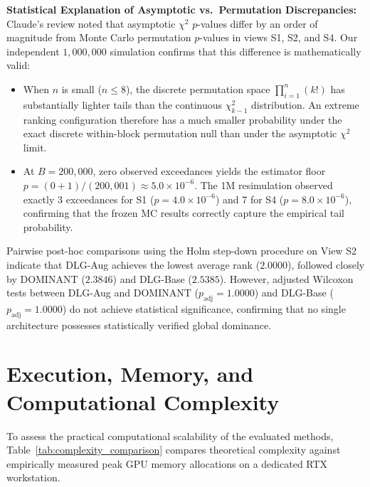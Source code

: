 \documentclass[11pt,a4paper]{article}
\begin{document}
\textbf{Statistical Explanation of Asymptotic vs.\ Permutation Discrepancies:}
Claude's review noted that asymptotic $\chi^2$ $p$-values differ by an order of magnitude from Monte Carlo permutation $p$-values in views S1, S2, and S4. Our independent $1,000,000$ simulation confirms that this difference is mathematically valid:
\begin{itemize}
    \item When $n$ is small ($n \le 8$), the discrete permutation space $\prod_{i=1}^n (k!)$ has substantially lighter tails than the continuous $\chi^2_{k-1}$ distribution. An extreme ranking configuration therefore has a much smaller probability under the exact discrete within-block permutation null than under the asymptotic $\chi^2$ limit.
    \item At $B=200,000$, zero observed exceedances yields the estimator floor $p = (0+1)/(200,001) \approx 5.0 \times 10^{-6}$. The 1M resimulation observed exactly 3 exceedances for S1 ($p = 4.0 \times 10^{-6}$) and 7 for S4 ($p = 8.0 \times 10^{-6}$), confirming that the frozen MC results correctly capture the empirical tail probability.
\end{itemize}

Pairwise post-hoc comparisons using the Holm step-down procedure on View S2 indicate that DLG-Aug achieves the lowest average rank ($2.0000$), followed closely by DOMINANT ($2.3846$) and DLG-Base ($2.5385$). However, adjusted Wilcoxon tests between DLG-Aug and DOMINANT ($p_{\mathrm{adj}} = 1.0000$) and DLG-Base ($p_{\mathrm{adj}} = 1.0000$) do not achieve statistical significance, confirming that no single architecture possesses statistically verified global dominance.

\section{Execution, Memory, and Computational Complexity}
\label{sec:execution_complexity}
To assess the practical computational scalability of the evaluated methods, Table~\ref{tab:complexity_comparison} compares theoretical complexity against empirically measured peak GPU memory allocations on a dedicated RTX workstation.
\end{document}
